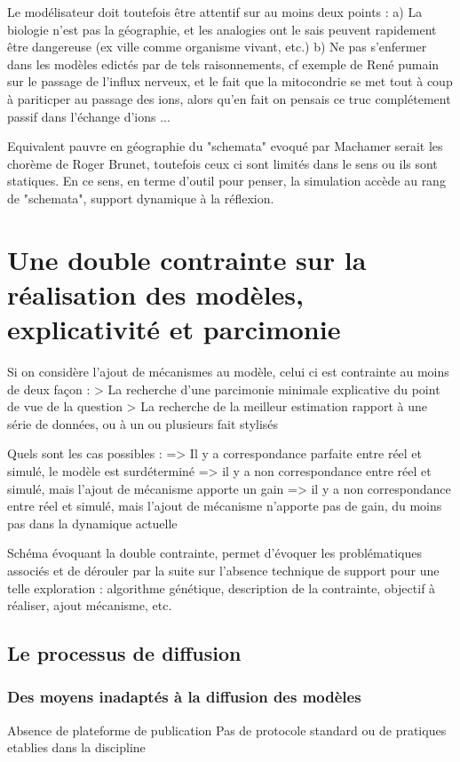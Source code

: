 {Le modélisateur doit toutefois être attentif sur au moins deux points : 
 a) La biologie n'est pas la géographie, et les analogies ont le sais peuvent rapidement être dangereuse (ex ville comme organisme vivant, etc.)
 b) Ne pas s'enfermer dans les modèles edictés par de tels raisonnements, cf exemple de René pumain sur le passage de l'influx nerveux, et le fait que la mitocondrie se met tout à coup à pariticper au passage des ions, alors qu'en fait on pensais ce truc complétement passif dans l'échange d'ions ... 

Equivalent pauvre en géographie du "schemata" evoqué par Machamer serait les chorème de Roger Brunet, toutefois ceux ci sont limités dans le sens ou ils sont statiques. En ce sens, en terme d'outil pour penser, la simulation accède au rang de "schemata", support dynamique à la réflexion.

\section{Une double contrainte sur la réalisation des modèles, explicativité et parcimonie}

Si on considère l'ajout de mécanismes au modèle, celui ci est contrainte au moins de deux façon : 
> La recherche d'une parcimonie minimale explicative du point de vue de la question
> La recherche de la meilleur estimation rapport à une série de données, ou à un ou plusieurs fait stylisés

Quels sont les cas possibles :
=> Il y a correspondance parfaite entre réel et simulé, le modèle est surdéterminé
=> il y a non correspondance entre réel et simulé, mais l'ajout de mécanisme apporte un gain
=> il y a non correspondance entre réel et simulé, mais l'ajout de mécanisme n'apporte pas de gain, du moins pas dans la dynamique actuelle

Schéma évoquant la double contrainte, permet d'évoquer les problématiques associés et de dérouler par la suite sur l'absence technique de support pour une telle exploration : algorithme génétique, description de la contrainte, objectif à réaliser, ajout mécanisme, etc.

\subsection{Le processus de diffusion}
\subsubsection{Des moyens inadaptés à la diffusion des modèles}
Absence de plateforme de publication
Pas de protocole standard ou de pratiques etablies dans la discipline

}
